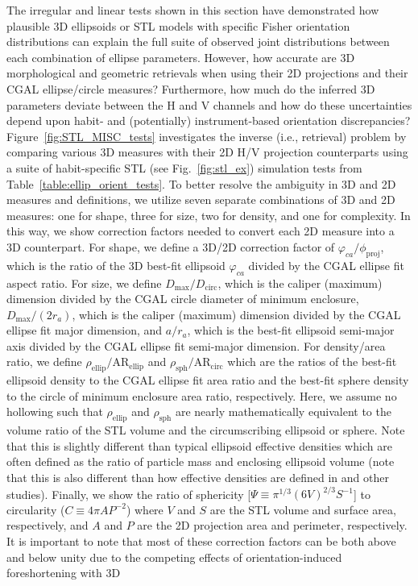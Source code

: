 \documentclass[amt, manuscript]{copernicus}
\begin{document}

The irregular and linear tests shown in this section have demonstrated how plausible 3D ellipsoids or STL models with specific Fisher orientation distributions can explain the full suite of observed joint distributions between each combination of ellipse parameters. However, how accurate are 3D morphological and geometric retrievals when using their 2D projections and their CGAL ellipse/circle measures? Furthermore, how much do the inferred 3D parameters deviate between the H and V channels and how do these uncertainties depend upon habit- and (potentially) instrument-based orientation discrepancies? Figure~\ref{fig:STL_MISC_tests} investigates the inverse (i.e., retrieval) problem by comparing various 3D measures with their 2D H/V projection counterparts using a suite of habit-specific STL (see Fig.~\ref{fig:stl_ex}) simulation tests from Table~\ref{table:ellip_orient_tests}. To better resolve the ambiguity in 3D and 2D measures and definitions, we utilize seven separate combinations of 3D and 2D measures: one for shape, three for size, two for density, and one for complexity. In this way, we show correction factors needed to convert each 2D measure into a 3D counterpart. For shape, we define a 3D/2D correction factor of $\varphi_{ca}/\phi_{\mathrm{proj}}$, which is the ratio of the 3D best-fit ellipsoid $\varphi_{ca}$ divided by the CGAL ellipse fit aspect ratio. For size, we define $D_{\max}/D_{\mathrm{circ}}$, which is the caliper (maximum) dimension divided by the CGAL circle diameter of minimum enclosure, $D_{\max}/(2 r_{a})$, which is the caliper (maximum) dimension divided by the CGAL ellipse fit major dimension, and $a/r_{a}$, which is the best-fit ellipsoid semi-major axis divided by the CGAL ellipse fit semi-major dimension. For density/area ratio, we define $\rho_{\mathrm{ellip}}/\mathrm{AR}_{\mathrm{ellip}}$ and $\rho_{\mathrm{sph}}/\mathrm{AR}_{\mathrm{circ}}$ which are the ratios of the best-fit ellipsoid density to the CGAL ellipse fit area ratio and the best-fit sphere density to the circle of minimum enclosure area ratio, respectively. Here, we assume no hollowing such that $\rho_{\mathrm{ellip}}$ and $\rho_{\mathrm{sph}}$ are nearly mathematically equivalent to the volume ratio of the STL volume and the circumscribing ellipsoid or sphere. Note that this is slightly different than typical ellipsoid effective densities which are often defined as the ratio of particle mass and enclosing ellipsoid volume (note that this is also different than how effective densities are defined in \citet{Heymsfield2004} and other studies). Finally, we show the ratio of sphericity [$\Psi\equiv \pi^{1/3} (6 V)^{2/3} S^{-1}$] to circularity ($C \equiv 4 \pi A P^{-2}$) where $V$ and $S$ are the STL volume and surface area, respectively, and $A$ and $P$ are the 2D projection area and perimeter, respectively. It is important to note that most of these correction factors can be both above and below unity due to the competing effects of orientation-induced foreshortening with 3D 
\end{document}
